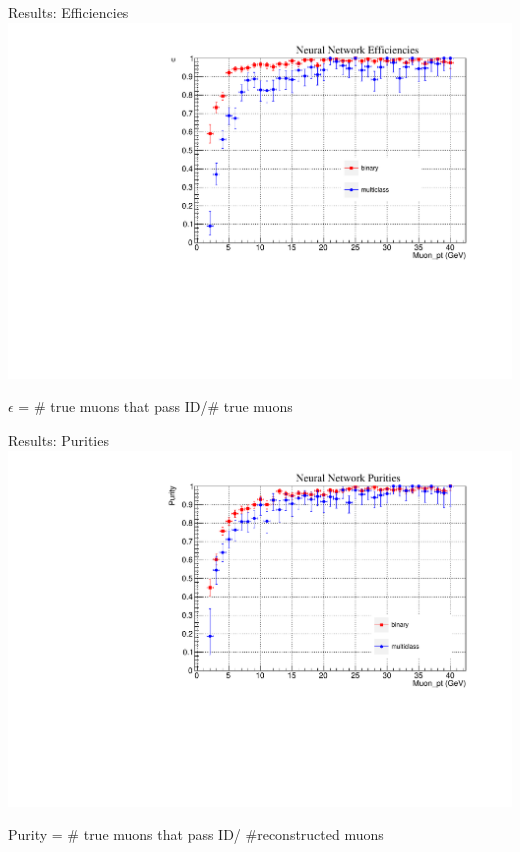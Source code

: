 \documentclass[10pt,handout]{beamer}
\begin{document}
\begin{frame}{Results: Efficiencies}
\centering
\includegraphics[scale=0.5]{NN_efficiencies.pdf}

$\epsilon$ = \# true muons that pass ID/\# true muons
\end{frame}

\begin{frame}{Results: Purities}
\centering
\includegraphics[scale=.5]{NN_purities.pdf}

Purity = \# true muons that pass ID/ \#reconstructed muons
\end{frame}
\end{document}
